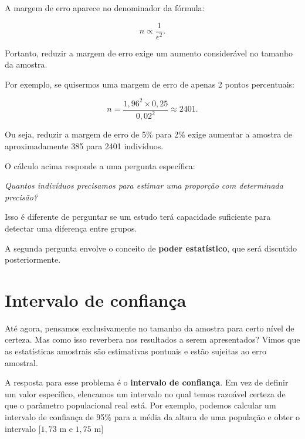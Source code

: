 \begin{deepdive}

A margem de erro aparece no denominador da fórmula:

\begin{equation}
    n \propto \frac{1}{\epsilon^2}.
\end{equation}

Portanto, reduzir a margem de erro exige um aumento considerável no tamanho da amostra.

Por exemplo, se quisermos uma margem de erro de apenas 2 pontos percentuais:

\[
    n =
    \frac{
        1{,}96^2 \times 0{,}25
    }{
        0{,}02^2
    }
    \approx
    2401.
\]

Ou seja, reduzir a margem de erro de 5\% para 2\% exige aumentar a amostra de aproximadamente 385 para 2401 indivíduos.
\end{deepdive}

\begin{error}

O cálculo acima responde a uma pergunta específica:

\begin{center}
\textit{Quantos indivíduos precisamos para estimar uma proporção com determinada precisão?}
\end{center}

Isso é diferente de perguntar se um estudo terá capacidade suficiente para detectar uma diferença entre grupos.

A segunda pergunta envolve o conceito de \textbf{poder estatístico}, que será discutido posteriormente.
\end{error}

\section{Intervalo de confiança}
Até agora, pensamos exclusivamente no tamanho da amostra para certo nível de certeza. Mas como isso reverbera nos resultados a serem apresentados? Vimos que as estatísticas amostrais são estimativas pontuais e estão sujeitas ao erro amostral.

A resposta para esse problema é o \textbf{intervalo de confiança}. Em vez de definir um valor específico, elencamos um intervalo no qual temos razoável certeza de que o parâmetro populacional real está. Por exemplo, podemos calcular um intervalo de confiança de 95\% para a média da altura de uma população e obter o intervalo [$1{,}73\text{ m}$ e $1{,}75\text{ m}$]


